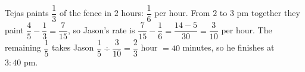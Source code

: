 Tejas paints $\dfrac{1}{3}$ of the fence in $2$ hours: $\dfrac{1}{6}$ per hour. From $2$ to $3$ pm together they paint $\dfrac{4}{5}-\dfrac{1}{3}=\dfrac{7}{15}$, so Jason's rate is $\dfrac{7}{15}-\dfrac{1}{6}=\dfrac{14-5}{30}=\dfrac{3}{10}$ per hour. The remaining $\dfrac{1}{5}$ takes Jason $\dfrac{1}{5}\div\dfrac{3}{10}=\dfrac{2}{3}$ hour $=40$ minutes, so he finishes at $\boxed{3{:}40\text{ pm}}$.
